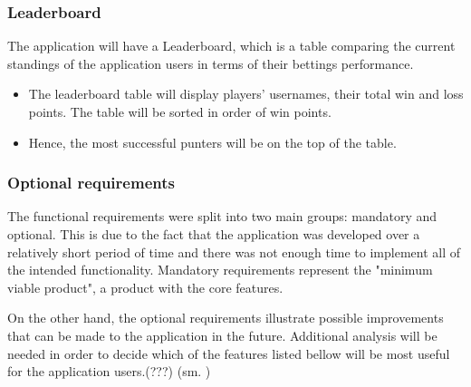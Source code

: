\subsubsection{Leaderboard}
\label{subsubsec:leaderboard_req}
The application will have a Leaderboard, which is a table comparing the current standings of the application users in terms of their bettings performance.
\begin{itemize}
    \item The leaderboard table will display players' usernames, their total win and loss points. The table will be sorted in order of win points.     
	 \item Hence, the most successful punters will be on the top of the table.
\end{itemize}

\subsubsection{Optional requirements}
\label{sec:optional_req}
The functional requirements were split into two main groups: mandatory and optional. This is due to the fact that the application was developed over a relatively short period of time and there was not enough time to implement all of the intended functionality. Mandatory requirements represent the "minimum viable product", a product with the core features. 

On the other hand, the optional requirements illustrate possible improvements that can be made to the application in the future. Additional analysis will be needed in order to decide which of the features listed bellow will be most useful for the application users.(???) (sm. )

